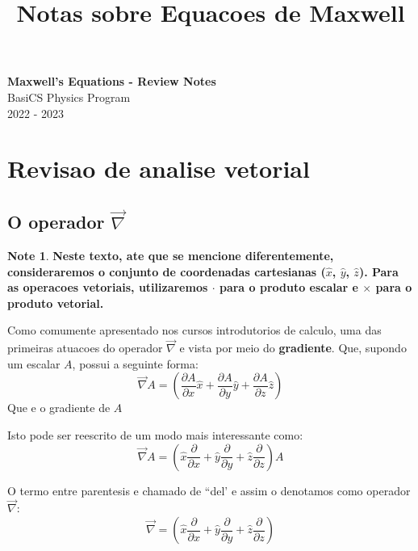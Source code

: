 \documentclass[11pt]{article}
\theoremstyle{definition}
\newtheorem{note}{Note}
\begin{document}
\setcounter{section}{0}
\title{Notas sobre Equacoes de Maxwell}

\thispagestyle{empty}

\begin{center}
{\LARGE \bf Maxwell's Equations - Review Notes}\\
{\large BasiCS Physics Program}\\
2022 - 2023
\end{center}
\section{Revisao de analise vetorial}
\subsection{O operador $\vec{\nabla}$}
\begin{note}
\textbf{Neste texto, ate que se mencione diferentemente, consideraremos o conjunto de coordenadas cartesianas ($\hat{x}$, $\hat{y}$, $\hat{z}$). Para as
operacoes vetoriais, utilizaremos $\cdot$ para o produto escalar e $\times$ para o produto vetorial.}
\end{note}

Como comumente apresentado nos cursos introdutorios de calculo, uma das primeiras atuacoes do operador $\vec{\nabla}$ e vista por meio do \textbf{gradiente}.
Que, supondo um escalar $A$, possui a seguinte forma:
\begin{equation}
\vec{\nabla} A = \left(\frac{\partial A}{\partial x}\hat{x}+\frac{\partial A}{\partial y}\hat{y}+\frac{\partial A}{\partial z}\hat{z}\right)
\end{equation}
Que e o gradiente de $A$ 

Isto pode ser reescrito de um modo mais interessante como:
\begin{equation}
\vec{\nabla} A = \left(\hat{x}\frac{\partial}{\partial x}+\hat{y}\frac{\partial}{\partial y}+\hat{z}\frac{\partial}{\partial z}\right)A
\end{equation}

O termo entre parentesis e chamado de ``del' e assim o denotamos como operador $\vec{\nabla}$:
\begin{equation}
\vec{\nabla} = \left(\hat{x}\frac{\partial}{\partial x}+\hat{y}\frac{\partial}{\partial y}+\hat{z}\frac{\partial}{\partial z}\right)
\end{equation}
\end{document}
